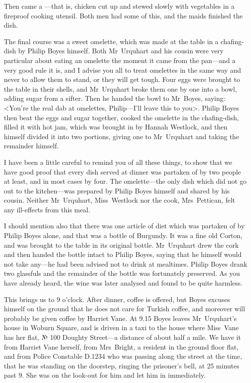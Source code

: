 Then came a —that is, chicken cut up and stewed slowly with vegetables in a fireproof cooking utensil. Both men had some of this, and the maids finished the dish.

The final course was a sweet omelette, which was made at the table in a chafing-dish by Philip Boyes himself. Both Mr~Urquhart and his cousin were very particular about eating an omelette the moment it came from the pan—and a very good rule it is, and I advise you all to treat omelettes in the same way and never to allow them to stand, or they will get tough. Four eggs were brought to the table in their shells, and Mr~Urquhart broke them one by one into a bowl, adding sugar from a sifter. Then he handed the bowl to Mr~Boyes, saying: <You're the real dab at omelettes, Philip—I'll leave this to you>. Philip Boyes then beat the eggs and sugar together, cooked the omelette in the chafing-dish, filled it with hot jam, which was brought in by Hannah Westlock, and then himself divided it into two portions, giving one to Mr~Urquhart and taking the remainder himself.

I have been a little careful to remind you of all these things, to show that we have good proof that every dish served at dinner was partaken of by two people at least, and in most cases by four. The omelette—the only dish which did not go out to the kitchen—was prepared by Philip Boyes himself and shared by his cousin. Neither Mr~Urquhart, Miss~Westlock nor the cook, Mrs~Pettican, felt any ill-effects from this meal.

I should mention also that there was one article of diet which was partaken of by Philip Boyes alone, and that was a bottle of Burgundy. It was a fine old Corton, and was brought to the table in its original bottle. Mr~Urquhart drew the cork and then handed the bottle intact to Philip Boyes, saying that he himself would not take any—he had been advised not to drink at mealtimes. Philip Boyes drank two glassfuls and the remainder of the bottle was fortunately preserved. As you have already heard, the wine was later analysed and found to be quite harmless.

This brings us to 9 o'clock. After dinner, coffee is offered, but Boyes excuses himself on the ground that he does not care for Turkish coffee, and moreover will probably be given coffee by Harriet Vane. At 9.15 Boyes leaves Mr~Urquhart's house in Woburn Square, and is driven in a taxi to the house where Miss~Vane has her flat, № 100 Doughty Street—a distance of about half a mile. We have it from Harriet Vane herself, from Mrs~Bright, a resident in the ground floor flat, and from Police Constable D\@.1234 who was passing along the street at the time, that he was standing on the doorstep, ringing the prisoner's bell, at 25 minutes past 9. She was on the look-out for him and let him in immediately.

